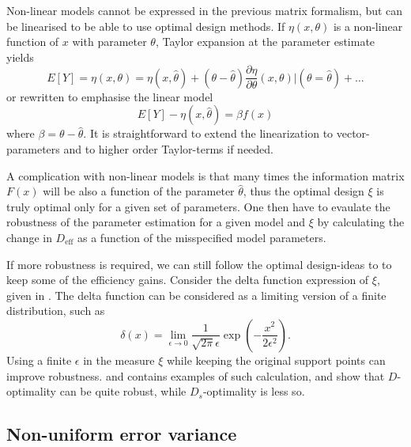 \documentclass[12pt]{iopart}
\begin{document}
Non-linear models cannot be expressed in the previous matrix formalism, but can be linearised to be able to use optimal design methods. If $\eta(x, \theta)$ is a non-linear function of $x$ with parameter $\theta$, Taylor expansion at the parameter estimate yields
\begin{equation}
E[Y] = \eta(x, \theta) = \eta(x, \hat \theta) + (\theta - \hat \theta) \frac{\partial \eta}{\partial \theta}(x, \theta)|(\theta = \hat \theta) + \ldots
\end{equation}
or rewritten to emphasise the linear model
\begin{equation}
E[Y] - \eta(x, \hat \theta) = \beta f(x)
\end{equation}
where $\beta = \theta - \hat \theta$. It is straightforward to extend the linearization to vector-parameters and to higher order Taylor-terms if needed.

A complication with non-linear models is that many times the information matrix $F(x)$ will be also a function of the parameter $\hat \theta$, thus the optimal design $\xi$ is truly optimal only for a given set of parameters. One then have to evaulate the robustness of the parameter estimation for a given model and $\xi$ by calculating the change in $D_\mathrm{eff}$ as a function of the misspecified model parameters. 

If more robustness is required, we can still follow the optimal design-ideas to to keep some of the efficiency gains. Consider the delta function expression of $\xi$, given in . The delta function can be considered as a limiting version of a finite distribution, such as
\begin{equation}
\delta(x) = \lim_{\epsilon \rightarrow 0} \frac{1}{\sqrt{2 \pi} \epsilon } \exp\left(-\frac{x^2}{2 \epsilon^2}\right).
\end{equation}
Using a finite $\epsilon$ in the measure $\xi$ while keeping the original support points can improve robustness.  and  contains examples of such calculation, and show that $D$-optimality can be quite robust, while $D_s$-optimality is less so.

\subsection{Non-uniform error variance}
\end{document}
